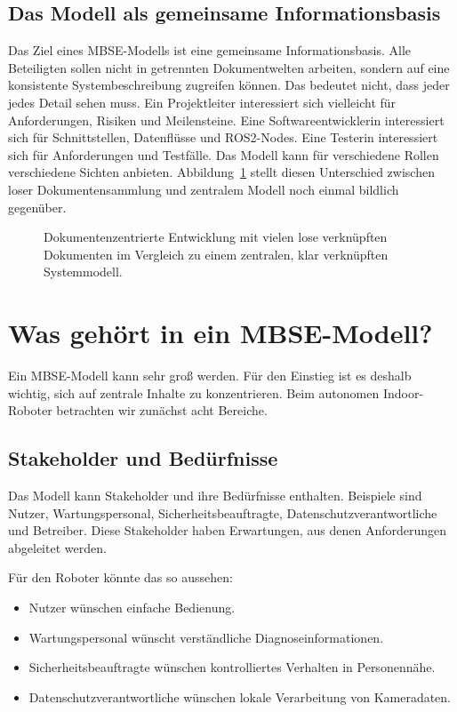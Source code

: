 \subsection{Das Modell als gemeinsame Informationsbasis}
Das Ziel eines MBSE-Modells ist eine gemeinsame Informationsbasis. Alle Beteiligten sollen nicht in getrennten Dokumentwelten arbeiten, sondern auf eine konsistente Systembeschreibung zugreifen können. Das bedeutet nicht, dass jeder jedes Detail sehen muss. Ein Projektleiter interessiert sich vielleicht für Anforderungen, Risiken und Meilensteine. Eine Softwareentwicklerin interessiert sich für Schnittstellen, Datenflüsse und ROS2-Nodes. Eine Testerin interessiert sich für Anforderungen und Testfälle. Das Modell kann für verschiedene Rollen verschiedene Sichten anbieten. Abbildung~\ref{fig:kap02-dokumentenzentriert-vs-modellbasiert} stellt diesen Unterschied zwischen loser Dokumentensammlung und zentralem Modell noch einmal bildlich gegenüber.

\begin{figure}[H]
  \centering
  \caption{Dokumentenzentrierte Entwicklung mit vielen lose verknüpften Dokumenten im Vergleich zu einem zentralen, klar verknüpften Systemmodell.}
  \label{fig:kap02-dokumentenzentriert-vs-modellbasiert}
\end{figure}

\section{Was gehört in ein MBSE-Modell?}
Ein MBSE-Modell kann sehr groß werden. Für den Einstieg ist es deshalb wichtig, sich auf zentrale Inhalte zu konzentrieren. Beim autonomen Indoor-Roboter betrachten wir zunächst acht Bereiche.

\subsection{Stakeholder und Bedürfnisse}
Das Modell kann Stakeholder und ihre Bedürfnisse enthalten. Beispiele sind Nutzer, Wartungspersonal, Sicherheitsbeauftragte, Datenschutzverantwortliche und Betreiber. Diese Stakeholder haben Erwartungen, aus denen Anforderungen abgeleitet werden.

Für den Roboter könnte das so aussehen:

\begin{itemize}
    \item Nutzer wünschen einfache Bedienung.
    \item Wartungspersonal wünscht verständliche Diagnoseinformationen.
    \item Sicherheitsbeauftragte wünschen kontrolliertes Verhalten in Personennähe.
    \item Datenschutzverantwortliche wünschen lokale Verarbeitung von Kameradaten.
\end{itemize}

